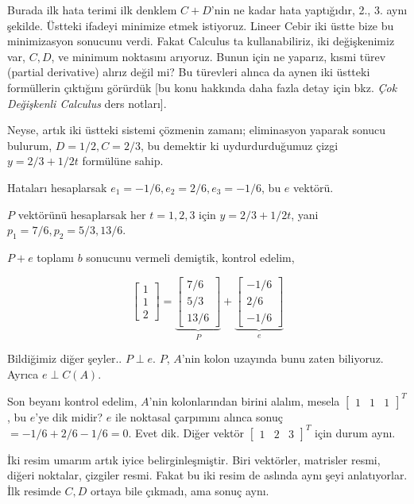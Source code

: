 \documentclass[12pt,fleqn]{article}\usepackage{../../common}
\begin{document}
Burada ilk hata terimi ilk denklem $C+D$'nin ne kadar hata yaptığıdır, 2.,
3. aynı şekilde. Üstteki ifadeyi minimize etmek istiyoruz. Lineer Cebir iki
üstte bize bu minimizasyon sonucunu verdi. Fakat Calculus ta
kullanabiliriz, iki değişkenimiz var, $C,D$, ve minimum noktasını arıyoruz.
Bunun için ne yaparız, kısmi türev (partial derivative) alırız değil mi? Bu
türevleri alınca da aynen iki üstteki formüllerin çıktığını görürdük [bu
konu hakkında daha fazla detay için bkz. {\em Çok Değişkenli Calculus} ders
notları].

Neyse, artık iki üstteki sistemi çözmenin zamanı; eliminasyon yaparak
sonucu bulurum, $D=1/2,C=2/3$, bu demektir ki uydurdurduğumuz çizgi 
$y=2/3+1/2t$ formülüne sahip.

Hataları hesaplarsak $e_1=-1/6,e_2=2/6,e_3=-1/6$, bu $e$ vektörü. 

$P$ vektörünü hesaplarsak her $t=1,2,3$ için $y=2/3+1/2t$, yani
$p_1=7/6,p_2=5/3,13/6$. 

$P+e$ toplamı $b$ sonucunu vermeli demiştik, kontrol edelim,

$$ 
\left[\begin{array}{r}
1 \\ 1 \\ 2
\end{array}\right]
=
\underbrace{
\left[\begin{array}{r}
7/6 \\ 5/3 \\ 13/6
\end{array}\right] 
}_{P}
+ 
\underbrace{
\left[\begin{array}{r}
-1/6 \\ 2/6 \\ -1/6
\end{array}\right]
}_{e}
 $$

Bildiğimiz diğer şeyler.. $P \perp e$. $P$, $A$'nin kolon uzayında bunu zaten
biliyoruz. Ayrıca $e \perp C(A)$.

Son beyanı kontrol edelim, $A$'nin kolonlarından birini alalım, mesela
$\left[\begin{array}{ccc} 1&1&1 \end{array}\right]^T$, bu $e$'ye dik midir?  $e$
ile noktasal çarpımını alınca sonuç $=-1/6+2/6-1/6=0$. Evet dik.  Diğer vektör
$\left[\begin{array}{ccc} 1&2&3 \end{array}\right]^T$ için durum aynı.

İki resim umarım artık iyice belirginleşmiştir. Biri vektörler, matrisler
resmi, diğeri noktalar, çizgiler resmi. Fakat bu iki resim de aslında aynı
şeyi anlatıyorlar. İlk resimde $C,D$ ortaya bile çıkmadı, ama sonuç aynı.
\end{document}
